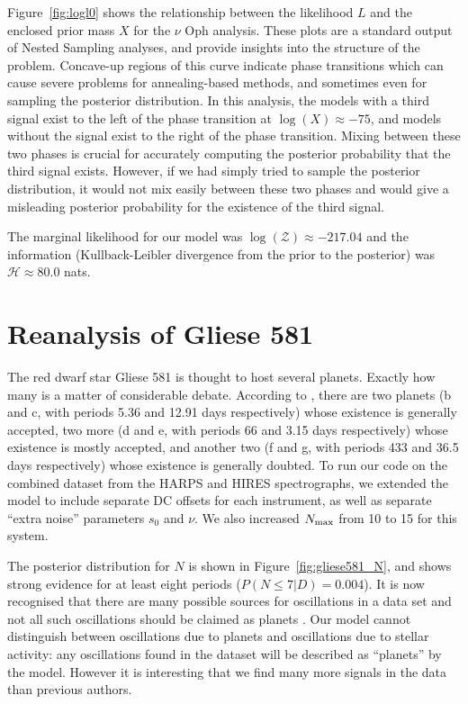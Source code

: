 \documentclass[useAMS,usenatbib]{mn2e}
\begin{document}
Figure~\ref{fig:logl0} shows the relationship between the likelihood $L$
and the enclosed prior mass $X$ for the $\nu$ Oph analysis. These plots are
a standard output of Nested Sampling analyses, and provide
insights into the structure of the problem. Concave-up regions of this curve
indicate phase transitions which can cause severe problems for annealing-based
methods, and sometimes even for sampling the posterior distribution. In this
analysis, the models with a third signal exist to the left of the phase
transition at $\log(X) \approx -75$, and models without the signal exist to the
right of the phase transition. Mixing between these two phases is crucial for
accurately computing the posterior probability that the third signal exists.
However, if we had simply tried to sample the posterior distribution, it would
not mix easily between these two phases and would give a misleading posterior
probability for the existence of the third signal.

The marginal likelihood for our model was
$\log(\mathcal{Z}) \approx -217.04$ and the information
(Kullback-Leibler divergence from the prior to the posterior)
was $\mathcal{H} \approx 80.0$ nats.

\section{Reanalysis of Gliese 581}
The red dwarf star Gliese 581 is thought to host several planets. Exactly
how many is a matter of considerable debate. According to
\citet{2014Sci...345..440R}, there are two planets
(b and c, with periods 5.36 and 12.91 days respectively)
whose existence is generally
accepted, two more
(d and e, with periods 66 and 3.15 days respectively)
whose existence is mostly accepted, and another two
(f and g, with periods 433 and 36.5 days respectively)
whose existence is generally doubted.
To run our code on the combined dataset from the HARPS and HIRES spectrographs,
we extended the model to include separate DC offsets for each instrument, as
well as separate ``extra noise'' parameters $s_0$ and $\nu$. We also increased
$N_{\rm max}$ from 10 to 15 for this system.

The posterior distribution for $N$ is shown in Figure~\ref{fig:gliese581_N},
and shows strong evidence for at least eight periods
($P(N \leq 7 | D) = 0.004$).
It is now recognised that
there are many possible sources for oscillations in a data set and not all
such oscillations should be claimed as planets \citep{2014Sci...345..440R}. 
Our model cannot distinguish between oscillations due to planets and
oscillations due to stellar activity: any oscillations found in the dataset
will be described as ``planets'' by the model. However it is interesting that
we find many more signals in the data than previous authors.
\end{document}

